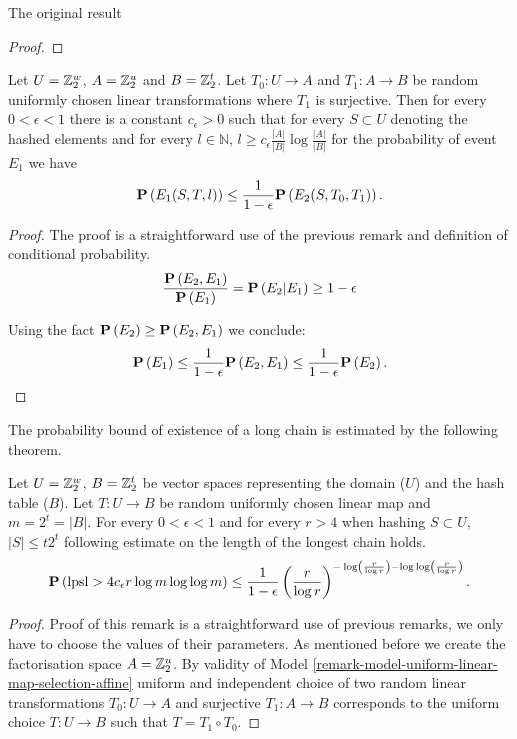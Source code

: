 \begin{section}{The original result}
\begin{proof}
\end{proof}

\begin{corollary}
\label{corollary-prob-e2-e1}
Let $U = \mathbb{Z}_{2}^{w}$, $A = \mathbb{Z}_{2}^{u}$ and $B = \mathbb{Z}_{2}^{t}$. Let $T_0: U \rightarrow A$ and $T_1: A \rightarrow B$ be random uniformly chosen linear transformations where $T_1$ is surjective. Then for every $0 < \epsilon < 1$ there is a constant $c_{\epsilon} > 0$ such that for every $S \subset U$ denoting the hashed  elements and for every $l \in \mathbb{N}$, $l \geq c_{\epsilon}{\frac{|A|}{|B|}}\log\frac{|A|}{|B|}$ for the probability of event $E_1$ we have
\[
	\mathbf{P}\left(E_1(S, T, l)\right) \leq \frac{1}{1 - \epsilon} \mathbf{P}\left(E_2(S, T_0, T_1)\right) \text{.}
\]
\end{corollary}
\begin{proof}
The proof is a straightforward use of the previous remark and definition of conditional probability.
\[
	\frac{\mathbf{P}\left(E_2, E_1\right)}{\mathbf{P}\left(E_1\right)} = \mathbf{P}\left(E_2 | E_1\right) \geq 1 - \epsilon
\]

Using the fact $\mathbf{P}\left(E_2\right) \geq \mathbf{P}\left(E_2, E_1\right)$ we conclude:
\[
	\mathbf{P}\left(E_1\right) \leq \frac{1}{1 - \epsilon}\mathbf{P}\left(E_2, E_1\right) \leq \frac{1}{1 - \epsilon}\mathbf{P}\left(E_2\right) \text{.}
\]
\end{proof}

The probability bound of existence of a long chain is estimated by the following theorem.
\begin{remark}
\label{remark-probability-long-chain}
Let $U = \mathbb{Z}_{2}^{w}$, $B = \mathbb{Z}_{2}^{t}$ be vector spaces representing the domain ($U$) and the hash table ($B$). Let $T: U \rightarrow B$ be random uniformly chosen linear map and $m = 2 ^ t = |B|$. For every $0 < \epsilon < 1$ and for every $r > 4$ when hashing $S \subset U$, $|S| \leq t 2 ^ t$ following estimate on the length of the longest chain holds.
\[
	\mathbf{P}\left(\mathrm{lpsl} > 4 c_\epsilon r \log m \log \log m\right) \leq \frac{1}{1 - \epsilon} \left(\frac{r}{\log r}\right)^{-\log \left(\frac{r}{\log r}\right) - \log \log \left(\frac{r}{\log r}\right)} \text{.}
\]
\end{remark}
\begin{proof}
Proof of this remark is a straightforward use of previous remarks, we only have to choose the values of their parameters. As mentioned before we create the factorisation space $A = \mathbb{Z}_{2}^{u}$. By validity of Model \ref{remark-model-uniform-linear-map-selection-affine} uniform and independent choice of two random linear transformations $T_0: U \rightarrow A$ and surjective $T_1: A \rightarrow B$ corresponds to the uniform choice $T: U \rightarrow B$ such that $T = T_1 \circ T_0$.


\end{proof}
\end{section}

